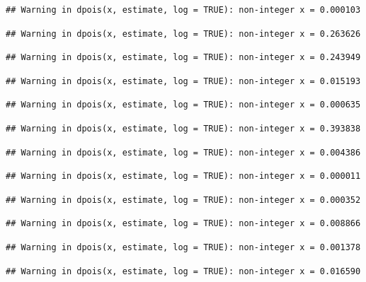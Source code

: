 \documentclass[]{article}
\begin{document}
\begin{verbatim}
## Warning in dpois(x, estimate, log = TRUE): non-integer x = 0.000103
\end{verbatim}

\begin{verbatim}
## Warning in dpois(x, estimate, log = TRUE): non-integer x = 0.263626
\end{verbatim}

\begin{verbatim}
## Warning in dpois(x, estimate, log = TRUE): non-integer x = 0.243949
\end{verbatim}

\begin{verbatim}
## Warning in dpois(x, estimate, log = TRUE): non-integer x = 0.015193
\end{verbatim}

\begin{verbatim}
## Warning in dpois(x, estimate, log = TRUE): non-integer x = 0.000635
\end{verbatim}

\begin{verbatim}
## Warning in dpois(x, estimate, log = TRUE): non-integer x = 0.393838
\end{verbatim}

\begin{verbatim}
## Warning in dpois(x, estimate, log = TRUE): non-integer x = 0.004386
\end{verbatim}

\begin{verbatim}
## Warning in dpois(x, estimate, log = TRUE): non-integer x = 0.000011
\end{verbatim}

\begin{verbatim}
## Warning in dpois(x, estimate, log = TRUE): non-integer x = 0.000352
\end{verbatim}

\begin{verbatim}
## Warning in dpois(x, estimate, log = TRUE): non-integer x = 0.008866
\end{verbatim}

\begin{verbatim}
## Warning in dpois(x, estimate, log = TRUE): non-integer x = 0.001378
\end{verbatim}

\begin{verbatim}
## Warning in dpois(x, estimate, log = TRUE): non-integer x = 0.016590
\end{verbatim}
\end{document}
